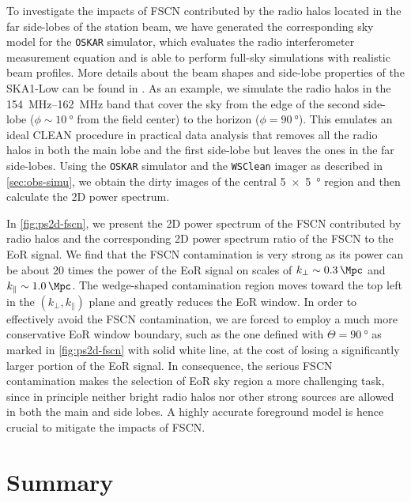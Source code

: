 \documentclass[twocolumn]{aastex62}
\newcommand{\klos}{\text{$k_{\parallel}$}}
\newcommand{\kperp}{\text{$k_{\bot}$}}
\newcommand{\editone}[1]{{\leavevmode\color{cyan}#1}}
\begin{document}
To investigate the impacts of FSCN contributed by the radio halos
located in the far side-lobes of the station beam, we have generated
the corresponding sky model for the \texttt{OSKAR} simulator,
which evaluates the radio interferometer measurement equation
\citep{smirnov2011} and is able to perform full-sky simulations with
realistic beam profiles.
More details about the beam shapes and side-lobe properties of the
SKA1-Low can be found in \citet{mort2017}.
As an example, we simulate the radio halos in the \SIrange{154}{162}{\MHz}
band that cover the sky from the edge of the second side-lobe
($\phi \sim \SI{10}{\degree}$ from the field center) to the horizon
($\phi = \SI{90}{\degree}$).
This emulates an ideal CLEAN procedure in practical data analysis that
removes all the radio halos in both the main lobe and the first side-lobe
but leaves the ones in the far side-lobes.
Using the \texttt{OSKAR} simulator and the \texttt{WSClean} imager as
described in \autoref{sec:obs-simu}, we obtain the dirty images of the
central \SI[product-units=repeat]{5 x 5}{\degree} region and then
calculate the 2D power spectrum.

\editone{%
In \autoref{fig:ps2d-fscn}, we present the 2D power spectrum of the FSCN
contributed by radio halos and the corresponding 2D power spectrum ratio
of the FSCN to the EoR signal.
We find that the FSCN contamination is very strong as its power can be
about 20 times the power of the EoR signal on scales of
$\kperp \sim \SI{0.3}{\per\Mpc}$ and $\klos \sim \SI{1.0}{\per\Mpc}$.}
The wedge-shaped contamination region moves toward the top left in
the $(\kperp, \klos)$ plane and greatly reduces the EoR window.
In order to effectively avoid the FSCN contamination, we are forced to
employ a much more conservative EoR window boundary, such as the one
defined with $\Theta = \SI{90}{\degree}$ as marked in
\autoref{fig:ps2d-fscn} with solid white line, at the cost of losing
a significantly larger portion of the EoR signal.
In consequence,
the serious FSCN contamination makes the selection of EoR sky region
a more challenging task, since in principle neither bright radio halos
nor other strong sources are allowed in both the main and side lobes.
A highly accurate foreground model is hence crucial to mitigate the
impacts of FSCN.


\section{Summary}
\label{sec:summary}
\end{document}
